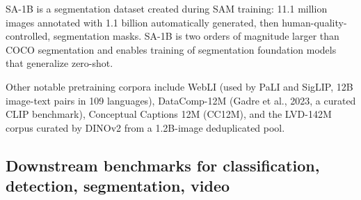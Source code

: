 \documentclass{article}
\begin{document}
SA-1B \citep{kirillov2023segmentanything} is a segmentation dataset created during SAM training: 11.1 million images annotated with 1.1 billion automatically generated, then human-quality-controlled, segmentation masks. SA-1B is two orders of magnitude larger than COCO segmentation and enables training of segmentation foundation models that generalize zero-shot.

Other notable pretraining corpora include WebLI (used by PaLI and SigLIP, 12B image-text pairs in 109 languages), DataComp-12M (Gadre et al., 2023, a curated CLIP benchmark), Conceptual Captions 12M (CC12M), and the LVD-142M corpus curated by DINOv2 from a 1.2B-image deduplicated pool.

\subsection{Downstream benchmarks for classification, detection, segmentation, video}\label{downstream-benchmarks-for-classification-detection-segmentation-video}
\end{document}
